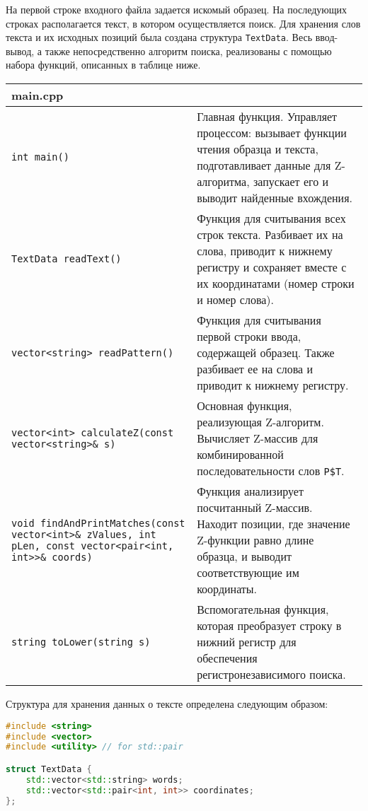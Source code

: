 На первой строке входного файла задается искомый образец. На последующих строках располагается текст, в котором осуществляется поиск. Для хранения слов текста и их исходных позиций была создана структура \texttt{TextData}. Весь ввод-вывод, а также непосредственно алгоритм поиска, реализованы с помощью набора функций, описанных в таблице ниже.

\begin{longtable}{|p{7.5cm}|p{7.5cm}|}
\hline
\rowcolor{lightgray}
\multicolumn{2}{|c|} {main.cpp}\\
\hline
\texttt{int main()} & Главная функция. Управляет процессом: вызывает функции чтения образца и текста, подготавливает данные для Z-алгоритма, запускает его и выводит найденные вхождения. \\
\hline
\texttt{TextData readText()} & Функция для считывания всех строк текста. Разбивает их на слова, приводит к нижнему регистру и сохраняет вместе с их координатами (номер строки и номер слова). \\
\hline
\texttt{vector<string> readPattern()} & Функция для считывания первой строки ввода, содержащей образец. Также разбивает ее на слова и приводит к нижнему регистру. \\
\hline
\texttt{vector<int> calculateZ(const vector<string>\& s)} & Основная функция, реализующая Z-алгоритм. Вычисляет Z-массив для комбинированной последовательности слов \texttt{P\$T}. \\
\hline
\texttt{void findAndPrintMatches(const vector<int>\& zValues, int pLen, const vector<pair<int, int>>\& coords)} & Функция анализирует посчитанный Z-массив. Находит позиции, где значение Z-функции равно длине образца, и выводит соответствующие им координаты. \\
\hline
\texttt{string toLower(string s)} & Вспомогательная функция, которая преобразует строку в нижний регистр для обеспечения регистронезависимого поиска. \\
\hline
\end{longtable}

\pagebreak

Структура для хранения данных о тексте определена следующим образом:
\begin{lstlisting}[language=C++]
#include <string>
#include <vector>
#include <utility> // for std::pair

struct TextData {
    std::vector<std::string> words;
    std::vector<std::pair<int, int>> coordinates;
};
\end{lstlisting}
\pagebreak

